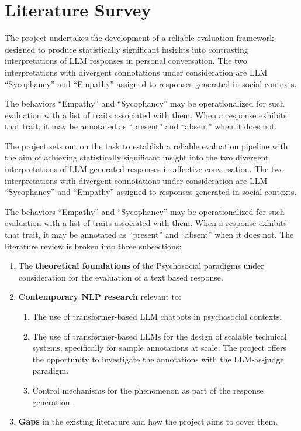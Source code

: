 \chapter{Literature Survey}\label{sec:Litreview}

The project undertakes the development of a reliable evaluation framework designed to produce statistically significant insights into contrasting interpretations of LLM responses in personal conversation. The two interpretations with divergent connotations under consideration are LLM “Sycophancy” and “Empathy” assigned to responses generated in social contexts. 

The behaviors “Empathy” and “Sycophancy” may be operationalized for such evaluation with a list of traits associated with them. When a response exhibits that trait, it may be annotated as “present” and “absent” when it does not. 

The project sets out on the task to establish a reliable evaluation pipeline with the aim of achieving statistically significant insight into the two divergent interpretations of LLM generated responses in affective conversation. The two interpretations with divergent connotations under consideration are LLM “Sycophancy” and “Empathy” assigned to responses generated in social contexts. 

The behaviors “Empathy” and “Sycophancy” may be operationalized for such evaluation with a list of traits associated with them. When a response exhibits that trait, it may be annotated as “present” and “absent” when it does not. The literature review is broken into three subsections:

\begin{enumerate}
    \item The \textbf{theoretical foundations} of the Psychosocial paradigms under consideration for the evaluation of a text based response.
    
    \item \textbf{Contemporary NLP research} relevant to:
    \begin{enumerate}[label=\alph*.]
        \item The use of transformer-based LLM chatbots in psychosocial contexts.
        \item The use of transformer-based LLMs for the design of scalable technical systems, specifically for sample annotations at scale. The project offers the opportunity to investigate the annotations with the LLM‑as‑judge paradigm.
        \item Control mechanisms for the phenomenon as part of the response generation.
    \end{enumerate}
    
    \item \textbf{Gaps} in the existing literature and how the project aims to cover them.
\end{enumerate}


